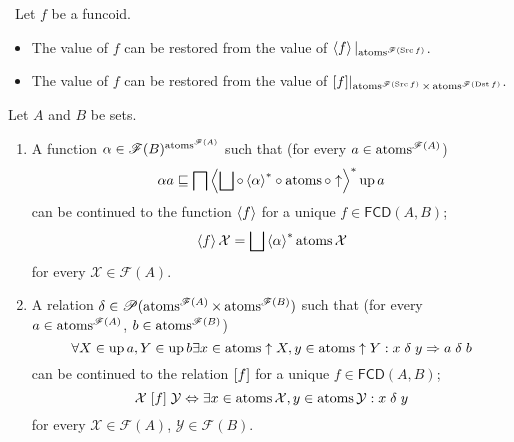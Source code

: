 \begin{cor}
~Let $f$ be a funcoid.
\begin{itemize}
\item The value of $f$ can be restored from the value of $\left\langle f\right\rangle|_{\operatorname{atoms}^{\mathscr{F}(\operatorname{Src} f)}}$.
\item The value of $f$ can be restored from the value of $\mathord{\mathrel{\left[f\right]}}|_{\operatorname{atoms}^{\mathscr{F}(\operatorname{Src} f)}\times\operatorname{atoms}^{\mathscr{F}(\operatorname{Dst} f)}}$.
\end{itemize}
\end{cor}
\begin{thm}
\label{cont-fcd-on-atoms}Let $A$ and $B$ be sets.
\begin{enumerate}
\item \label{at-restr-f}A function
$\alpha\in\mathscr{F}(B)^{\operatorname{atoms}^{\mathscr{F}(A)}}$
such that (for every $a\in\operatorname{atoms}^{\mathscr{F}(A)}$)
\begin{equation}
\alpha
a\sqsubseteq\bigsqcap\rsupfun{\bigsqcup\circ\rsupfun{\alpha}
\circ\atoms\circ\uparrow}\up a\label{at-func-cond}
\end{equation}
can be continued to the function $\left\langle f\right\rangle$ for a unique
$f\in\mathsf{FCD}(A,B)$;
\begin{equation}
\supfun
f\mathcal{X}=\bigsqcup\rsupfun{\alpha}\atoms\mathcal{X}\label{at-func-eq}
\end{equation}
for every $\mathcal{X}\in\mathscr{F}(A)$.

\item \label{at-restr-r}A relation
$\delta\in\mathscr{P}(\operatorname{atoms}^{\mathscr{F}(A)}\times\operatorname{atoms}^{\mathscr{F}(B)})$
such that (for every $a\in\operatorname{atoms}^{\mathscr{F}(A)}$,
$b\in\operatorname{atoms}^{\mathscr{F}(B)}$)
\begin{equation}
\forall X\in\operatorname{up} a,Y\in\operatorname{up} b\exists x\in\operatorname{atoms}\uparrow X,y\in\operatorname{atoms}\uparrow
Y:x\mathrel\delta y\Rightarrow a\mathrel\delta b\label{at-rel-cond}
\end{equation}
can be continued to the relation $\mathrel{\left[f\right]}$ for a unique
$f\in\mathsf{FCD}(A,B)$;
\begin{equation}
\mathcal{X}\mathrel{\left[f\right]}\mathcal{Y}\Leftrightarrow\exists
x\in\operatorname{atoms}\mathcal{X},y\in\operatorname{atoms}\mathcal{Y}:x\mathrel\delta y\label{at-rel-eq}
\end{equation}
for every $\mathcal{X}\in\mathscr{F}(A)$, $\mathcal{Y}\in\mathscr{F}(B)$.

\end{enumerate}
\end{thm}
